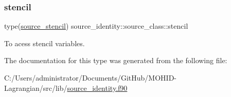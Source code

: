 \subsubsection{\texorpdfstring{stencil}{stencil}}
{\footnotesize\ttfamily type(\mbox{\hyperlink{structsource__identity_1_1source__stencil}{source\+\_\+stencil}}) source\+\_\+identity\+::source\+\_\+class\+::stencil\hspace{0.3cm}{\ttfamily [private]}}



To acess stencil variables. 



The documentation for this type was generated from the following file\+:\begin{DoxyCompactItemize}
\item 
C\+:/\+Users/administrator/\+Documents/\+Git\+Hub/\+M\+O\+H\+I\+D-\/\+Lagrangian/src/lib/\mbox{\hyperlink{source__identity_8f90}{source\+\_\+identity.\+f90}}\end{DoxyCompactItemize}
